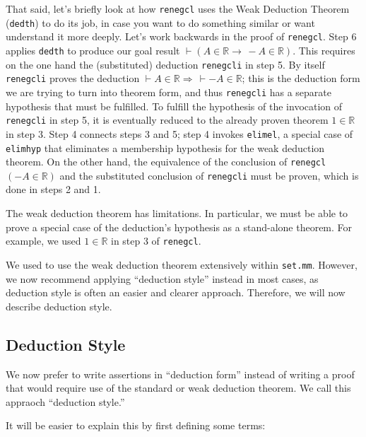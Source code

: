 That said, let's briefly look at how
\texttt{renegcl} uses the
Weak Deduction Theorem (\texttt{dedth}) to do its job,
in case you want to do something similar or want understand it more deeply.
Let's work backwards in the proof of \texttt{renegcl}.
Step 6 applies \texttt{dedth} to produce our goal result
$ \vdash ( A \in \mathbb{R} \rightarrow\, - A \in \mathbb{R} )$.
This requires on the one hand the (substituted) deduction
\texttt{renegcli} in step 5.
By itself \texttt{renegcli} proves the deduction
$ \vdash A \in \mathbb{R} \Rightarrow\, \vdash - A \in \mathbb{R}$;
this is the deduction form we are trying to turn into theorem form,
and thus
\texttt{renegcli} has a separate hypothesis that must be fulfilled.
To fulfill the hypothesis of the invocation of
\texttt{renegcli} in step 5, it is eventually
reduced to the already proven theorem $1 \in \mathbb{R}$ in step 3.
Step 4 connects steps 3 and 5; step 4 invokes
\texttt{elimel}, a special case of \texttt{elimhyp} that eliminates
a membership hypothesis for the weak deduction theorem.
On the other hand, the equivalence of the conclusion of
\texttt{renegcl}
$( - A \in \mathbb{R} )$ and the substituted conclusion of
\texttt{renegcli} must be proven, which is done in steps 2 and 1.

The weak deduction theorem has limitations.
In particular, we must be able to prove a special case of the deduction's
hypothesis as a stand-alone theorem.
For example, we used $1 \in \mathbb{R}$ in step 3 of \texttt{renegcl}.

We used to use the weak deduction theorem
extensively within \texttt{set.mm}.
However, we now recommend applying ``deduction style''
instead in most cases, as deduction style is
often an easier and clearer approach.
Therefore, we will now describe deduction style.

\subsection{Deduction Style}\label{deductionstyle}

We now prefer to write assertions in ``deduction form''
instead of writing a proof that would require use of the standard or
weak deduction theorem.
We call this appraoch
``deduction style.''

It will be easier to explain this by first defining some terms:

